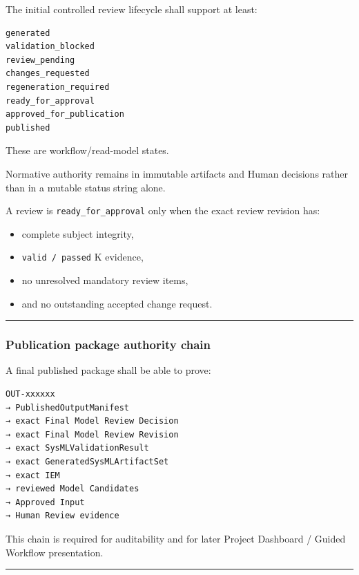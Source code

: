 The initial controlled review lifecycle shall support at least:

\begin{verbatim}
generated
validation_blocked
review_pending
changes_requested
regeneration_required
ready_for_approval
approved_for_publication
published
\end{verbatim}

These are workflow/read-model states.

Normative authority remains in immutable artifacts and Human decisions rather than in a mutable status string alone.

A review is \texttt{ready\_for\_approval} only when the exact review revision has:

\begin{itemize}
\tightlist
\item
  complete subject integrity,
\item
  \texttt{valid\ /\ passed} K evidence,
\item
  no unresolved mandatory review items,
\item
  and no outstanding accepted change request.
\end{itemize}

\begin{center}\rule{0.5\linewidth}{0.5pt}\end{center}

\hypertarget{publication-package-authority-chain}{%
\subsubsection{Publication package authority chain}\label{publication-package-authority-chain}}

A final published package shall be able to prove:

\begin{verbatim}
OUT-xxxxxx
→ PublishedOutputManifest
→ exact Final Model Review Decision
→ exact Final Model Review Revision
→ exact SysMLValidationResult
→ exact GeneratedSysMLArtifactSet
→ exact IEM
→ reviewed Model Candidates
→ Approved Input
→ Human Review evidence
\end{verbatim}

This chain is required for auditability and for later Project Dashboard / Guided Workflow presentation.

\begin{center}\rule{0.5\linewidth}{0.5pt}\end{center}

